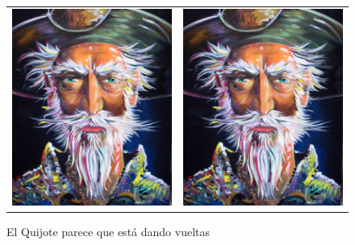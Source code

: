 \documentclass{book}
\begin{document}
\begin{figure}[t]
\begin{tabular}{cc}
\end{tabular} 
\begin{tabular}{cc}
\includegraphics[scale=0.5, angle=-10]{quijote}&\includegraphics[scale=0.5, angle=20,trim={0cm 2cm 0cm 2cm}, clip]{quijote} 
\end{tabular}
\caption{El Quijote parece que est\'a dando vueltas}
\end{figure}
\end{document}
